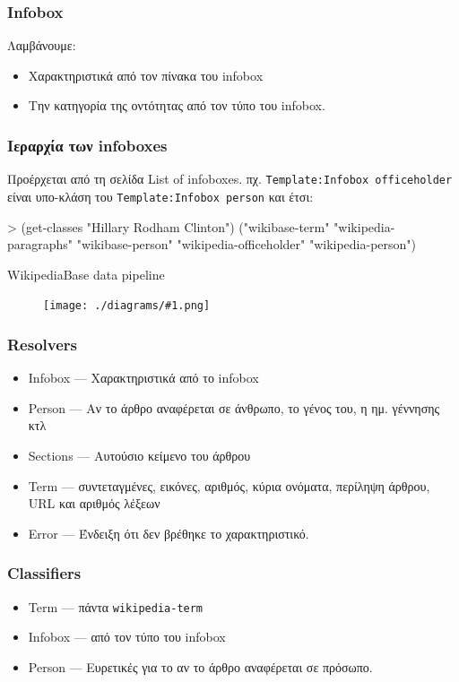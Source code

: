 \documentclass[bigger]{beamer}
\newenvironment{code}{\ttfamily}{\par}
\newcommand{\figframe}[2]{
  \begin{frame}{#2}
    \vfill
    \begin{figure}
      \centering
      \texttt{[image: ./diagrams/\#1.png]}
    \end{figure}
    \vfill
  \end{frame}
}
\begin{document}
\begin{frame}
  \frametitle{Infobox}
  Λαμβάνουμε:
  \begin{itemize}
  \item Χαρακτηριστικά από τον πίνακα του infobox
  \item Την κατηγορία της οντότητας από τον τύπο του infobox.
  \end{itemize}
\end{frame}

\begin{frame}
  \frametitle{Ιεραρχία των infoboxes}

  Προέρχεται από τη σελίδα List of infoboxes.
  πχ. \texttt{Template:Infobox officeholder} είναι υπο-κλάση του
  \texttt{Template:Infobox person} και έτσι:

  \vfill
  \begin{code}
    > (get-classes "Hillary Rodham Clinton")
    ("wikibase-term"
    "wikipedia-paragraphs"
    "wikibase-person"
    "wikipedia-officeholder"
    "wikipedia-person")
  \end{code}
\end{frame}

\figframe{wikipediabase-pipeline}{WikipediaBase data pipeline}

\begin{frame}
  \frametitle{Resolvers}
  \begin{itemize}
  \item Infobox --- Χαρακτηριστικά από το infobox
  \item Person --- Αν το άρθρο αναφέρεται σε άνθρωπο, το γένος του, η
    ημ. γέννησης κτλ
  \item Sections --- Αυτούσιο κείμενο του άρθρου
  \item Term --- συντεταγμένες, εικόνες, αριθμός, κύρια ονόματα,
    περίληψη άρθρου, URL και αριθμός λέξεων
  \item Error --- Ένδειξη ότι δεν βρέθηκε το χαρακτηριστικό.
  \end{itemize}
\end{frame}

\begin{frame}
  \frametitle{Classifiers}
  \begin{itemize}
  \item Term --- πάντα \texttt{wikipedia-term}
  \item Infobox --- από τον τύπο του infobox
  \item Person --- Ευρετικές για το αν το άρθρο αναφέρεται σε πρόσωπο.
  \end{itemize}
\end{frame}
\end{document}
